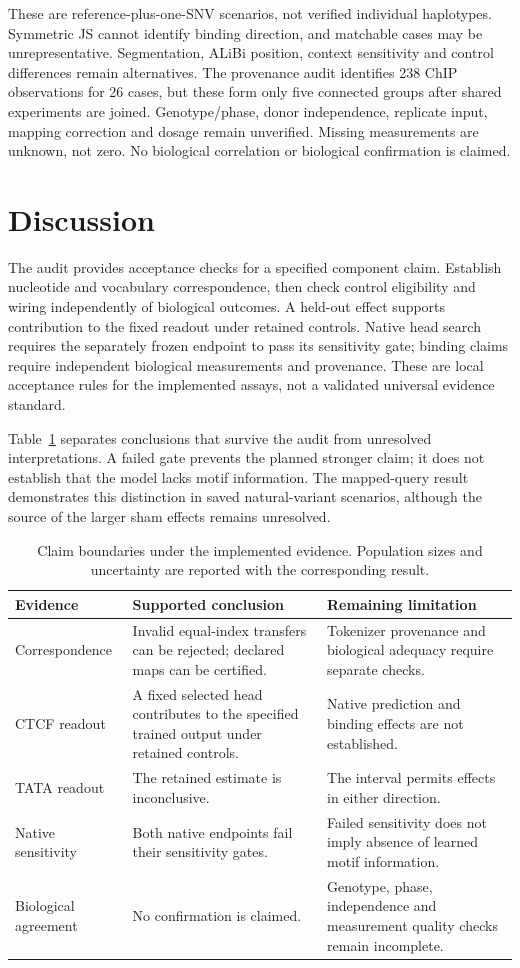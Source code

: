 \documentclass[10pt,letterpaper]{article}
\begin{document}
These are reference-plus-one-SNV scenarios, not verified individual haplotypes. Symmetric JS cannot identify binding direction, and matchable cases may be unrepresentative. Segmentation, ALiBi position, context sensitivity and control differences remain alternatives. The provenance audit identifies 238 ChIP observations for 26 cases, but these form only five connected groups after shared experiments are joined. Genotype/phase, donor independence, replicate input, mapping correction and dosage remain unverified. Missing measurements are unknown, not zero. No biological correlation or biological confirmation is claimed.
\section{Discussion}
The audit provides acceptance checks for a specified component claim. Establish nucleotide and vocabulary correspondence, then check control eligibility and wiring independently of biological outcomes. A held-out effect supports contribution to the fixed readout under retained controls. Native head search requires the separately frozen endpoint to pass its sensitivity gate; binding claims require independent biological measurements and provenance. These are local acceptance rules for the implemented assays, not a validated universal evidence standard.

Table~\ref{tab:claims} separates conclusions that survive the audit from unresolved interpretations. A failed gate prevents the planned stronger claim; it does not establish that the model lacks motif information. The mapped-query result demonstrates this distinction in saved natural-variant scenarios, although the source of the larger sham effects remains unresolved.
\begin{table}[h]\centering\small
\caption{Claim boundaries under the implemented evidence. Population sizes and uncertainty are reported with the corresponding result.}\label{tab:claims}
\begin{tabular}{p{.20\linewidth}p{.33\linewidth}p{.36\linewidth}}\toprule
Evidence & Supported conclusion & Remaining limitation \\\midrule
Correspondence & Invalid equal-index transfers can be rejected; declared maps can be certified. & Tokenizer provenance and biological adequacy require separate checks. \\
CTCF readout & A fixed selected head contributes to the specified trained output under retained controls. & Native prediction and binding effects are not established. \\
TATA readout & The retained estimate is inconclusive. & The interval permits effects in either direction. \\
Native sensitivity & Both native endpoints fail their sensitivity gates. & Failed sensitivity does not imply absence of learned motif information. \\
Biological agreement & No confirmation is claimed. & Genotype, phase, independence and measurement quality checks remain incomplete. \\\bottomrule
\end{tabular}\end{table}\FloatBarrier
\end{document}
